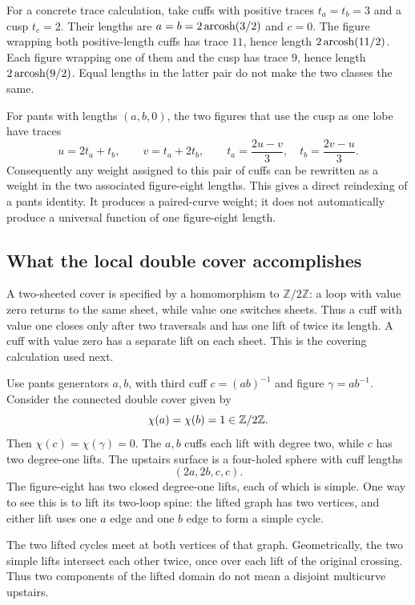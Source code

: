 For a concrete trace calculation, take cuffs with positive traces
$t_a=t_b=3$ and a cusp $t_c=2$. Their lengths are
$a=b=2\operatorname{arcosh}(3/2)$ and $c=0$. The figure wrapping both
positive-length cuffs has trace $11$, hence length
$2\operatorname{arcosh}(11/2)$. Each figure wrapping one of them and the cusp
has trace $9$, hence length $2\operatorname{arcosh}(9/2)$. Equal lengths in
the latter pair do not make the two classes the same.

For pants with lengths $(a,b,0)$, the two figures that use the cusp as one
lobe have traces
\begin{equation}
 u=2t_a+t_b,\qquad v=t_a+2t_b,
 \qquad
 t_a=\frac{2u-v}{3},\quad t_b=\frac{2v-u}{3}.
 \label{eq:twofigures}
\end{equation}
Consequently any weight assigned to this pair of cuffs can be rewritten
as a weight in the two associated figure-eight lengths. This gives a
direct reindexing of a pants identity. It produces a paired-curve weight;
it does not automatically produce a universal function of one figure-eight
length.

\subsection{What the local double cover accomplishes}

A two-sheeted cover is specified by a homomorphism to
$\mathbb Z/2\mathbb Z$: a loop with value zero returns to the
same sheet, while value one switches sheets. Thus a cuff with
value one closes only after two traversals and has one lift of
twice its length. A cuff with value zero has a separate lift on
each sheet. This is the covering calculation used next.

Use pants generators $a,b$, with third cuff $c=(ab)^{-1}$ and figure
$\gamma=ab^{-1}$. Consider the connected double cover given by
\[
 \chi(a)=\chi(b)=1\in\mathbb Z/2\mathbb Z.
\]
Then $\chi(c)=\chi(\gamma)=0$. The $a,b$ cuffs each lift with degree two,
while $c$ has two degree-one lifts. The upstairs surface is a four-holed
sphere with cuff lengths
\begin{equation}
 (2a,2b,c,c).
 \label{eq:doublepants}
\end{equation}
The figure-eight has two closed degree-one lifts, each of which is simple.
One way to see this is to lift its two-loop spine: the lifted graph has
two vertices, and either lift uses one $a$ edge and one $b$ edge to form
a simple cycle.

The two lifted cycles meet at both vertices of that graph. Geometrically,
the two simple lifts intersect each other twice, once over each lift of
the original crossing. Thus two components of the lifted domain do not
mean a disjoint multicurve upstairs.

